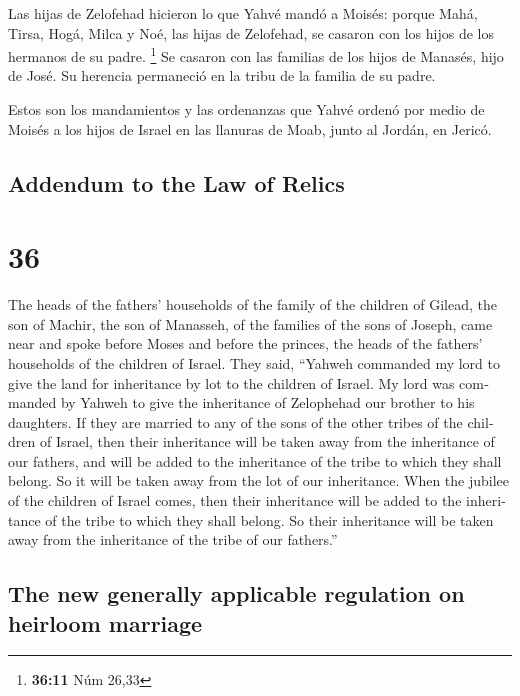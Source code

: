 \begin{paracol}{2}
 Las hijas de Zelofehad hicieron lo que Yahvé mandó a
Moisés:  porque Mahá, Tirsa, Hogá, Milca y Noé, las hijas
de Zelofehad, se casaron con los hijos de los hermanos de su padre.
\footnote{\textbf{36:11} Núm 26,33}  Se casaron con las
familias de los hijos de Manasés, hijo de José. Su herencia permaneció
en la tribu de la familia de su padre.

 Estos son los mandamientos y las ordenanzas que Yahvé
ordenó por medio de Moisés a los hijos de Israel en las llanuras de
Moab, junto al Jordán, en Jericó. \switchcolumn
\begin{otherlanguage}{english}

\hypertarget{addendum-to-the-law-of-relics}{%
\subsection{Addendum to the Law of
Relics}\label{addendum-to-the-law-of-relics}}

\hypertarget{section-71}{%
\section{36}\label{section-71}}

 The heads of the fathers' households of the family of the
children of Gilead, the son of Machir, the son of Manasseh, of the
families of the sons of Joseph, came near and spoke before Moses and
before the princes, the heads of the fathers' households of the children
of Israel.  They said, ``Yahweh commanded my lord to give
the land for inheritance by lot to the children of Israel. My lord was
commanded by Yahweh to give the inheritance of Zelophehad our brother to
his daughters.  If they are married to any of the sons of
the other tribes of the children of Israel, then their inheritance will
be taken away from the inheritance of our fathers, and will be added to
the inheritance of the tribe to which they shall belong. So it will be
taken away from the lot of our inheritance.  When the
jubilee of the children of Israel comes, then their inheritance will be
added to the inheritance of the tribe to which they shall belong. So
their inheritance will be taken away from the inheritance of the tribe
of our fathers.''

\hypertarget{the-new-generally-applicable-regulation-on-heirloom-marriage}{%
\subsection{The new generally applicable regulation on heirloom
marriage}\label{the-new-generally-applicable-regulation-on-heirloom-marriage}}


\end{otherlanguage}
\end{paracol}
